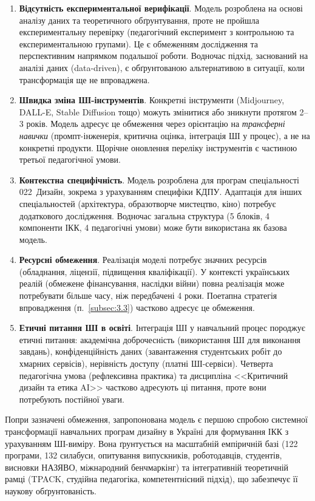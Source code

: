 \begin{enumerate}
    \item \textbf{Відсутність експериментальної верифікації}. Модель розроблена на основі аналізу даних та теоретичного обґрунтування, проте не пройшла експериментальну перевірку (педагогічний експеримент з контрольною та експериментальною групами). Це є обмеженням дослідження та перспективним напрямком подальшої роботи. Водночас підхід, заснований на аналізі даних (data-driven), є обґрунтованою альтернативою в ситуації, коли трансформація ще не впроваджена.

    \item \textbf{Швидка зміна ШІ-інструментів}. Конкретні інструменти (Midjourney, DALL-E, Stable Diffusion тощо) можуть змінитися або зникнути протягом 2--3 років. Модель адресує це обмеження через орієнтацію на \textit{трансферні навички} (промпт-інженерія, критична оцінка, інтеграція ШІ у процес), а не на конкретні продукти. Щорічне оновлення переліку інструментів є частиною третьої педагогічної умови.

    \item \textbf{Контекстна специфічність}. Модель розроблена для програм спеціальності 022~Дизайн, зокрема з урахуванням специфіки КДПУ. Адаптація для інших спеціальностей (архітектура, образотворче мистецтво, кіно) потребує додаткового дослідження. Водночас загальна структура (5 блоків, 4 компоненти ІКК, 4 педагогічні умови) може бути використана як базова модель.

    \item \textbf{Ресурсні обмеження}. Реалізація моделі потребує значних ресурсів (обладнання, ліцензії, підвищення кваліфікації). У контексті українських реалій (обмежене фінансування, наслідки війни) повна реалізація може потребувати більше часу, ніж передбачені 4 роки. Поетапна стратегія впровадження (п.~\ref{subsec:3.3}) частково адресує це обмеження.

    \item \textbf{Етичні питання ШІ в освіті}. Інтеграція ШІ у навчальний процес породжує етичні питання: академічна доброчесність (використання ШІ для виконання завдань), конфіденційність даних (завантаження студентських робіт до хмарних сервісів), нерівність доступу (платні ШІ-сервіси). Четверта педагогічна умова (рефлексивна практика) та дисципліна <<Критичний дизайн та етика AI>> частково адресують ці питання, проте вони потребують постійної уваги.
\end{enumerate}

Попри зазначені обмеження, запропонована модель є першою спробою системної трансформації навчальних програм дизайну в Україні для формування ІКК з урахуванням ШІ-виміру. Вона ґрунтується на масштабній емпіричній базі (122 програми, 132 силабуси, опитування випускників, роботодавців, студентів, висновки НАЗЯВО, міжнародний бенчмаркінг) та інтегративній теоретичній рамці (TPACK, студійна педагогіка, компетентнісний підхід), що забезпечує її наукову обґрунтованість.
